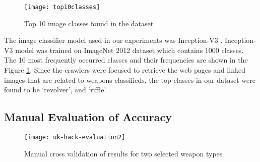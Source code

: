 \begin{figure}[h]
	\texttt{[image: top10classes]}
	\caption{Top 10 image classes found in the dataset}
	\label{fig:top10ImgClass}
\end{figure}
The image classifier model used in our experiments was Inception-V3 \cite{SzegedyVISW15}. Inception-V3 model was trained on ImageNet 2012 dataset which contains 1000 classes\cite{ILSVRC15}.
The 10 most frequently occurred classes and their frequencies are shown in the Figure \ref{fig:top10ImgClass}. Since the crawlers were focused to retrieve the web pages and linked images that are related to weapons classifieds, the top classes in our dataset were found to be `revolver', and `riffle'.

\subsection{Manual Evaluation of Accuracy}
\begin{figure}[h]
	\texttt{[image: uk-hack-evaluation2]}
	\caption{Manual cross validation of results for two selected weapon types}
	\label{fig:uk-hack-eval}
\end{figure}
